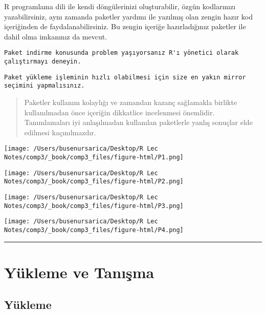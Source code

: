 \documentclass[
]{book}
\begin{document}
R programlama dili ile kendi döngülerinizi oluşturabilir, özgün kodlarınızı yazabilirsiniz, aynı zamanda paketler yardımı ile yazılmış olan zengin hazır kod içeriğinden de faydalanabilirsiniz. Bu zengin içeriğe hazırladığınız paketler ile dahil olma imkanınız da mevcut.

\begin{verbatim}
Paket indirme konusunda problem yaşıyorsanız R'ı yönetici olarak çalıştırmayı deneyin. 
\end{verbatim}

\begin{verbatim}
Paket yükleme işleminin hızlı olabilmesi için size en yakın mirror seçimini yapmalısınız.
\end{verbatim}

\begin{quote}
Paketler kullanım kolaylığı ve zamandan kazanç sağlamakla birlikte kullanılmadan önce içeriğin dikkatlice incelenmesi önemlidir. Tanımlamaları iyi anlaşılmadan kullanılan paketlerle yanlış sonuçlar elde edilmesi kaçınılmazdır.
\end{quote}

\texttt{[image: /Users/busenursarica/Desktop/R Lec Notes/comp3/\_book/comp3\_files/figure-html/P1.png]}

\texttt{[image: /Users/busenursarica/Desktop/R Lec Notes/comp3/\_book/comp3\_files/figure-html/P2.png]}

\texttt{[image: /Users/busenursarica/Desktop/R Lec Notes/comp3/\_book/comp3\_files/figure-html/P3.png]}

\texttt{[image: /Users/busenursarica/Desktop/R Lec Notes/comp3/\_book/comp3\_files/figure-html/P4.png]}

\begin{center}\rule{0.5\linewidth}{0.5pt}\end{center}

\hypertarget{yuxfckleme-ve-tanux131ux15fma}{%
\chapter{Yükleme ve Tanışma}\label{yuxfckleme-ve-tanux131ux15fma}}

\hypertarget{yuxfckleme}{%
\section{Yükleme}\label{yuxfckleme}}
\end{document}
